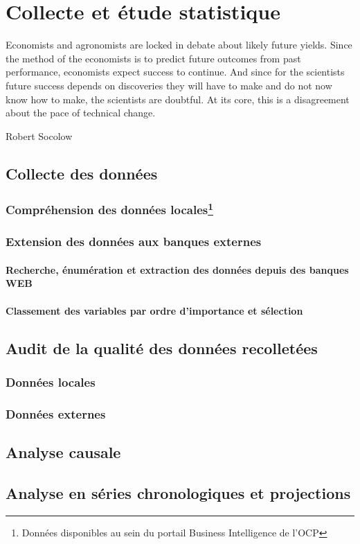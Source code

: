 \chapter{Collecte et étude statistique}
\epigraph{Economists and agronomists are locked in debate about likely
future yields. Since the method of the economists is to predict
future outcomes from past performance, economists expect
success to continue. And since for the scientists future success
depends on discoveries they will have to make and do not now
know how to make, the scientists are doubtful. At its core, this is
a disagreement about the pace of technical change.}{Robert
Socolow}	
\cleardoublepage

	\section{Collecte des données}
	\subsection{Compréhension des données locales\protect\footnote{Données disponibles au sein du portail Business Intelligence de l'OCP}}
	\subsection{Extension des données aux banques externes}
	\subsubsection{Recherche, énumération et extraction des données depuis des banques WEB}
	\subsubsection{Classement des variables par ordre d'importance et sélection}
	\section{Audit de la qualité des données recolletées}
	\subsection{Données locales}
	\subsection{Données externes}
	\section{Analyse causale}
	\section{Analyse en séries chronologiques et projections}